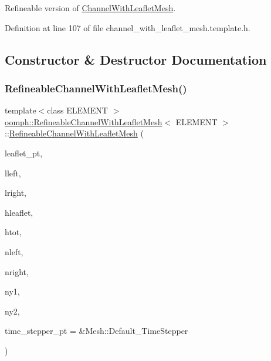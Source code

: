 Refineable version of \hyperlink{classoomph_1_1ChannelWithLeafletMesh}{Channel\+With\+Leaflet\+Mesh}. 

Definition at line 107 of file channel\+\_\+with\+\_\+leaflet\+\_\+mesh.\+template.\+h.



\subsection{Constructor \& Destructor Documentation}
\mbox{\label{classoomph_1_1RefineableChannelWithLeafletMesh_a9af91f13b3fd683029e2bdfbfe3abd66}} 
\subsubsection{\texorpdfstring{Refineable\+Channel\+With\+Leaflet\+Mesh()}{RefineableChannelWithLeafletMesh()}}
{\footnotesize\ttfamily template$<$class E\+L\+E\+M\+E\+NT $>$ \\
\hyperlink{classoomph_1_1RefineableChannelWithLeafletMesh}{oomph\+::\+Refineable\+Channel\+With\+Leaflet\+Mesh}$<$ E\+L\+E\+M\+E\+NT $>$\+::\hyperlink{classoomph_1_1RefineableChannelWithLeafletMesh}{Refineable\+Channel\+With\+Leaflet\+Mesh} (\begin{DoxyParamCaption}\item[{Geom\+Object $\ast$}]{leaflet\+\_\+pt,  }\item[{const double \&}]{lleft,  }\item[{const double \&}]{lright,  }\item[{const double \&}]{hleaflet,  }\item[{const double \&}]{htot,  }\item[{const unsigned \&}]{nleft,  }\item[{const unsigned \&}]{nright,  }\item[{const unsigned \&}]{ny1,  }\item[{const unsigned \&}]{ny2,  }\item[{Time\+Stepper $\ast$}]{time\+\_\+stepper\+\_\+pt = {\ttfamily \&Mesh\+:\+:Default\+\_\+TimeStepper} }\end{DoxyParamCaption})\hspace{0.3cm}{\ttfamily [inline]}}



